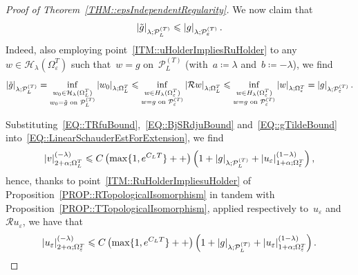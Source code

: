 \documentclass[12pt,a4paper]{amsart}
\makeatletter
\numberwithin{equation}{section}
\theoremstyle{definition}
\theoremstyle{remark}
\newcommand{\eps}{\varepsilon}
\newcommand{\abs}[1]{\left\lvert#1\right\rvert}
\renewcommand{\leq}{\leqslant}
\newcommand{\const}[1]{%
  \csname const@#1\endcsname%
}
\makeatother
\begin{document}
\begin{proof}[Proof of Theorem~\ref{THM::epsIndependentRegularity}]
    We now claim that
    \begin{equation}\label{EQ::gTildeBound}
        \abs{\tilde{g}}_{\lambda; \mathcal{P}_L^{(T)}} \leq \const{CONST::PiecewiseRegularityToGlobalWithTime}\abs{g}_{\lambda; \mathcal{P}_\eps^{(T)}}.
    \end{equation}
    Indeed, also employing point~\ref{ITM::uHolderImpliesRuHolder} to any~$w \in \mathcal{H}_\lambda(\Omega_\eps^T)$ such that~$w=g$ on~$\mathcal{P}_L^{(T)}$ (with~$a \coloneq \lambda$ and~$b \coloneq -\lambda$), we find
    \begin{equation}
        \abs{\tilde{g}}_{\lambda; \mathcal{P}_L^{(T)}} = \inf_{\substack{w_0 \in \mathcal{H}_\lambda(\Omega_L^T)\\w_0 = \tilde{g}\text{ on }\mathcal{P}_L^{(T)}}}\abs{w_0}_{\lambda; \Omega_L^T} \leq \const{CONST::PiecewiseRegularityToGlobalWithTime}\inf_{\substack{w \in H_\lambda(\Omega_\eps^T)\\w = g\text{ on } \mathcal{P}_\eps^{(T)}}}\abs{\mathcal{R}w}_{\lambda;\Omega_L^T} \leq \const{CONST::PiecewiseRegularityToGlobalWithTime}\inf_{\substack{w \in H_\lambda(\Omega_\eps^T)\\w = g\text{ on } \mathcal{P}_\eps^{(T)}}}\abs{w}_{\lambda;\Omega_\eps^T} = \const{CONST::PiecewiseRegularityToGlobalWithTime} \abs{g}_{\lambda; \mathcal{P}_\eps^{(T)}}.
    \end{equation}

    Substituting~\eqref{EQ::TRfuBound},~\eqref{EQ::BjSRdjuBound} and~\eqref{EQ::gTildeBound} into~\eqref{EQ::LinearSchauderEstForExtension}, we find
    \begin{equation}
        \abs{v}_{2+\alpha; \Omega_L^T}^{(-\lambda)} \leq C\left(\const{CONST::RuHolderEstimate}\const{CONST::TTopologicalIsomorphismUpper}\const{CONST::ForcingTermCalphaBound}\max\{1,e^{C_L T}\} + \const{CONST::BjTRdjuHolder} + \const{CONST::PiecewiseRegularityToGlobalWithTime}\right) \left(1 + \abs{g}_{\lambda; \mathcal{P}_L^{(T)}} + \abs{u_\eps}_{1+\alpha; \Omega_\eps^T}^{(1-\lambda)}\right),
    \end{equation}
    hence, thanks to point~\ref{ITM::RuHolderImpliesuHolder} of Proposition~\ref{PROP::RTopologicalIsomorphism} in tandem with Proposition~\ref{PROP::TTopologicalIsomorphism}, applied respectively to~$u_\eps$ and~$\mathcal{R}u_\eps$, we have that
    \begin{equation}\label{EQ::uUniformSchauderBeforeInterpolation}
        \abs{u_\eps}_{2+\alpha; \Omega_\eps^T}^{(-\lambda)} \leq C\left(\const{CONST::RuHolderEstimate}\const{CONST::TTopologicalIsomorphismUpper}\const{CONST::ForcingTermCalphaBound}\max\{1,e^{C_L T}\} + \const{CONST::BjTRdjuHolder} + \const{CONST::PiecewiseRegularityToGlobalWithTime}\right) \left(1 + \abs{g}_{\lambda; \mathcal{P}_L^{(T)}} + \abs{u_\eps}_{1+\alpha; \Omega_\eps^T}^{(1-\lambda)}\right).
    \end{equation}


\end{proof}
\end{document}
